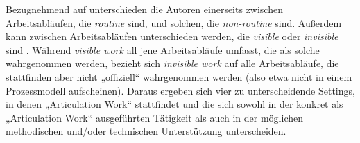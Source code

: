 Bezugnehmend auf \citet{Strauss93} unterschieden die Autoren einerseits zwischen Arbeitsabläufen, die \emph{routine} sind, und solchen, die \emph{non-routine} sind. Außerdem kann zwischen Arbeitsabläufen unterschieden werden, die \emph{visible} oder \emph{invisible} sind \citep{Star99}. Während \emph{visible work} all jene Arbeitsabläufe umfasst, die als solche wahrgenommen werden, bezieht sich \emph{invisible work} auf alle Arbeitsabläufe, die stattfinden aber nicht „offiziell“ wahrgenommen werden (also etwa nicht in einem Prozessmodell aufscheinen).  Daraus ergeben sich vier zu unterscheidende Settings, in denen „Articulation Work“ stattfindet und die sich sowohl in der konkret als „Articulation Work“ ausgeführten Tätigkeit als auch in der möglichen methodischen und/oder technischen Unterstützung unterscheiden.

